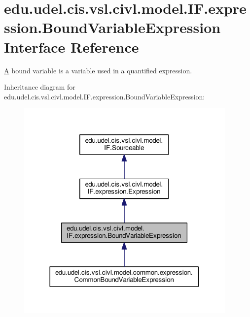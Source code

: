 \hypertarget{interfaceedu_1_1udel_1_1cis_1_1vsl_1_1civl_1_1model_1_1IF_1_1expression_1_1BoundVariableExpression}{}\section{edu.\+udel.\+cis.\+vsl.\+civl.\+model.\+I\+F.\+expression.\+Bound\+Variable\+Expression Interface Reference}
\label{interfaceedu_1_1udel_1_1cis_1_1vsl_1_1civl_1_1model_1_1IF_1_1expression_1_1BoundVariableExpression}


\hyperlink{structA}{A} bound variable is a variable used in a quantified expression.  




Inheritance diagram for edu.\+udel.\+cis.\+vsl.\+civl.\+model.\+I\+F.\+expression.\+Bound\+Variable\+Expression\+:
\nopagebreak
\begin{figure}[H]
\begin{center}
\leavevmode
\includegraphics[width=306pt]{interfaceedu_1_1udel_1_1cis_1_1vsl_1_1civl_1_1model_1_1IF_1_1expression_1_1BoundVariableExpression__inherit__graph}
\end{center}
\end{figure}


